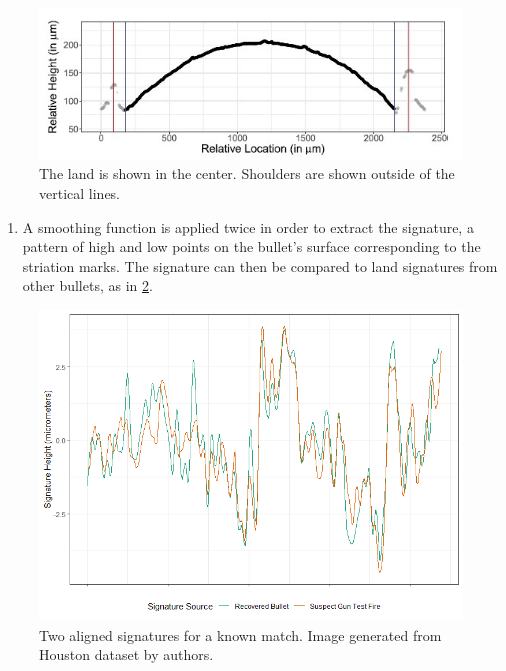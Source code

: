 \documentclass[print]{nuthesis}
\providecommand{\tightlist}{%
  \setlength{\itemsep}{0pt}\setlength{\parskip}{0pt}}
\begin{document}
\begin{figure}
\includegraphics[width=\linewidth]{images/shoulder} \caption{The land is shown in the center. Shoulders are shown outside of the vertical lines.}\label{fig:shoulder}
\end{figure}

\begin{enumerate}
\def\labelenumi{\arabic{enumi}.}
\setcounter{enumi}{1}
\tightlist
\item
  A smoothing function is applied twice in order to extract the signature, a pattern of high and low points on the bullet's surface corresponding to the striation marks.
  The signature can then be compared to land signatures from other bullets, as in \ref{fig:signature}.
\end{enumerate}

\begin{figure}
\includegraphics[width=\linewidth]{images/F526_Match_Signatures} \caption{Two aligned signatures for a known match. Image generated from Houston dataset by authors.}\label{fig:signature}
\end{figure}
\end{document}
